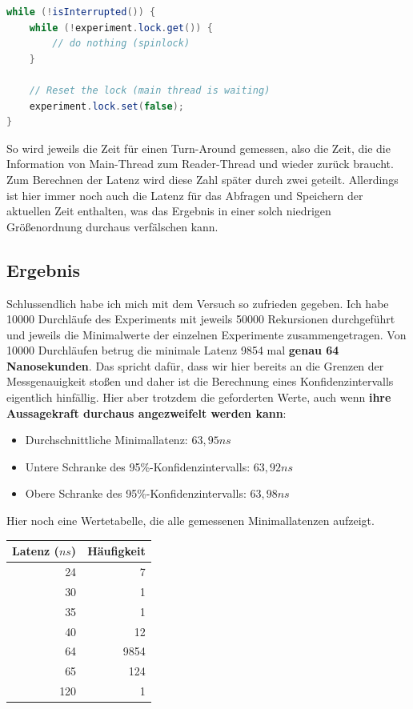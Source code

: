\documentclass[12pt]{article}
\begin{document}
\begin{lstlisting}[language=java,caption={Latenzmessung im Reader Thread (optimiert)}]
while (!isInterrupted()) {
	while (!experiment.lock.get()) {
		// do nothing (spinlock)
	}
	
	// Reset the lock (main thread is waiting)
	experiment.lock.set(false);
}
\end{lstlisting}

So wird jeweils die Zeit für einen Turn-Around gemessen, also die Zeit, die die Information von Main-Thread zum Reader-Thread und wieder zurück braucht.
Zum Berechnen der Latenz wird diese Zahl später durch zwei geteilt.
Allerdings ist hier immer noch auch die Latenz für das Abfragen und Speichern der aktuellen Zeit enthalten, was das Ergebnis in einer solch niedrigen Größenordnung durchaus verfälschen kann.

\subsection*{Ergebnis}
Schlussendlich habe ich mich mit dem Versuch so zufrieden gegeben.
Ich habe 10000 Durchläufe des Experiments mit jeweils 50000 Rekursionen durchgeführt und jeweils die Minimalwerte der einzelnen Experimente zusammengetragen.
Von 10000 Durchläufen betrug die minimale Latenz 9854 mal \textbf{genau 64 Nanosekunden}.
Das spricht dafür, dass wir hier bereits an die Grenzen der Messgenauigkeit stoßen und daher ist die Berechnung eines Konfidenzintervalls eigentlich hinfällig. Hier aber trotzdem die geforderten Werte, auch wenn \textbf{ihre Aussagekraft durchaus angezweifelt werden kann}:
\begin{itemize}
	\item Durchschnittliche Minimallatenz: $63,95 ns$
	\item Untere Schranke des 95\%-Konfidenzintervalls: $63,92 ns$
	\item Obere Schranke des 95\%-Konfidenzintervalls: $63,98 ns$
\end{itemize}

Hier noch eine Wertetabelle, die alle gemessenen Minimallatenzen aufzeigt.

\begin{table}[H]
	\centering
	\label{tab:latencies}
	\begin{tabular}{|r|r|}
		\hline
		Latenz ($ns$) & Häufigkeit \\
		\hline
		24 & 7 \\
		30 & 1 \\
		35 & 1 \\
		40 & 12 \\
		64 & 9854 \\
		65 & 124 \\
		120 & 1 \\
		\hline
	\end{tabular}
\end{table}
\end{document}
